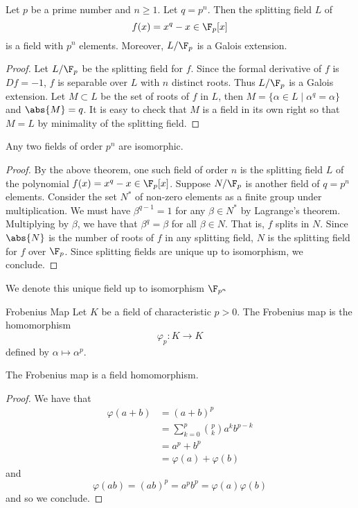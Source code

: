 \documentclass[a4paper]{article}
\begin{document}
\begin{thm}{}{} Let $p$ be a prime number and $n\geq 1$. Let $q=p^n$. Then the splitting field $L$ of $$f(x)=x^q-x\in \F_p[x]$$ is a field with $p^n$ elements. Moreover, $L/\F_p$ is a Galois extension. \tcbline
\begin{proof}
Let $L/\F_p$ be the splitting field for $f$. Since the formal derivative of $f$ is $Df=-1$, $f$ is separable over $L$ with $n$ distinct roots. Thus $L/\F_p$ is a Galois extension. Let $M\subset L$ be the set of roots of $f$ in $L$, then $M=\{\alpha\in L\;|\;\alpha^q=\alpha\}$ and $\abs{M}=q$. It is easy to check that $M$ is a field in its own right so that $M=L$ by minimality of the splitting field. 
\end{proof}
\end{thm}

\begin{prp}{}{} Any two fields of order $p^n$ are isomorphic. \tcbline
\begin{proof}
By the above theorem, one such field of order $n$ is the splitting field $L$ of the polynomial $f(x)=x^q-x\in\F_p[x]$. Suppose $N/\F_p$ is another field of $q=p^n$ elements. Consider the set $N^\ast$ of non-zero elements as a finite group under multiplication. We must have $\beta^{q-1}=1$ for any $\beta\in N^\ast$ by Lagrange's theorem. Multiplying by $\beta$, we have that $\beta^q=\beta$ for all $\beta\in N$. That is, $f$ splits in $N$. Since $\abs{N}$ is the number of roots of $f$ in any splitting field, $N$ is the splitting field for $f$ over $\F_p$. Since splitting fields are unique up to isomorphism, we conclude. 
\end{proof}
\end{prp}

We denote this unique field up to isomorphism $\F_{p^n}$

\begin{defn}{Frobenius Map}{} Let $K$ be a field of characteristic $p>0$. The Frobenius map is the homomorphism $$\varphi_p:K\to K$$ defined by $\alpha\mapsto\alpha^p$. 
\end{defn}

\begin{lmm}{}{} The Frobenius map is a field homomorphism. \tcbline
\begin{proof}
We have that 
\begin{align*}
\varphi(a+b)&=(a+b)^p\\
&=\sum_{k=0}^p\binom{p}{k}a^kb^{p-k}\\
&=a^p+b^p\\
&=\varphi(a)+\varphi(b)
\end{align*}
and $$\varphi(ab)=(ab)^p=a^pb^p=\varphi(a)\varphi(b)$$ and so we conclude. 
\end{proof}
\end{lmm}
\end{document}
